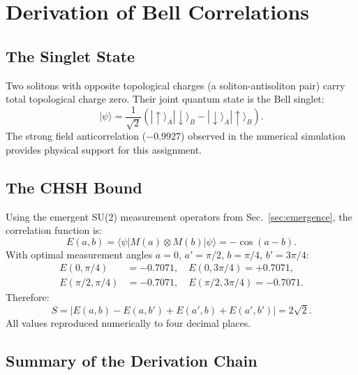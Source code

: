 \documentclass[11pt,a4paper]{article}
\begin{document}
\section{Derivation of Bell Correlations}

\subsection{The Singlet State}

Two solitons with opposite topological charges (a soliton-antisoliton pair) carry total topological charge zero. Their joint quantum state is the Bell singlet:
\begin{equation}
|\psi\rangle = \frac{1}{\sqrt{2}}(|{\uparrow}\rangle_A|{\downarrow}\rangle_B - |{\downarrow}\rangle_A|{\uparrow}\rangle_B).
\end{equation}
The strong field anticorrelation ($-0.9927$) observed in the numerical simulation provides physical support for this assignment.

\subsection{The CHSH Bound}

Using the emergent SU(2) measurement operators from Sec.~\ref{sec:emergence}, the correlation function is:
\begin{equation}
E(a,b) = \langle\psi| M(a) \otimes M(b) |\psi\rangle = -\cos(a-b).
\end{equation}
With optimal measurement angles $a = 0$, $a' = \pi/2$, $b = \pi/4$, $b' = 3\pi/4$:
\begin{align}
E(0, \pi/4) &= -0.7071, \quad E(0, 3\pi/4) = +0.7071, \\
E(\pi/2, \pi/4) &= -0.7071, \quad E(\pi/2, 3\pi/4) = -0.7071.
\end{align}
Therefore:
\begin{equation}
S = |E(a,b) - E(a,b') + E(a',b) + E(a',b')| = 2\sqrt{2}.
\end{equation}
All values reproduced numerically to four decimal places.

\subsection{Summary of the Derivation Chain}

\begin{center}
\end{center}
\end{document}
